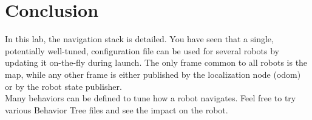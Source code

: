 \documentclass{ecnreport}
\begin{document}
\section{Conclusion}

In this lab, the navigation stack is detailed. You have seen that a single, potentially well-tuned, configuration file can be used for several robots by updating it on-the-fly during launch. The only frame common to all robots is the map, while any other frame is either published by the localization node (odom) or by the robot state publisher. \\

Many behaviors can be defined to tune how a robot navigates. Feel free to try various Behavior Tree files and see the impact on the robot.
\end{document}
